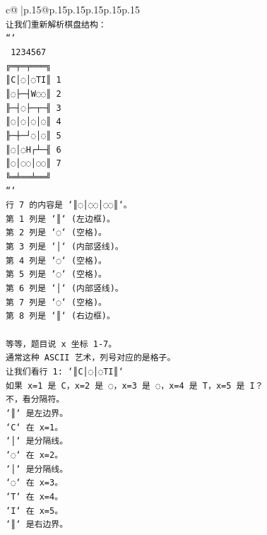 \documentclass{article}
\begin{document}
{\begin{supertabular}{c@{$\;$}|p{.15\linewidth}@{}p{.15\linewidth}p{.15\linewidth}p{.15\linewidth}p{.15\linewidth}p{.15\linewidth}}
{{{\\ 
\texttt{让我们重新解析棋盘结构：} \\
\texttt{```} \\
\texttt{ 1234567} \\
\texttt{╔═╤═╤═══╗} \\
\texttt{║C│◌│◌TI║ 1} \\
\texttt{║◌├─┤W◌◌║ 2} \\
\texttt{╟─┤◌├─┬─╢ 3} \\
\texttt{║◌│◌│◌│◌║ 4} \\
\texttt{╟─┼─┘◌│◌║ 5} \\
\texttt{║◌│◌H┌┴─╢ 6} \\
\texttt{║◌│◌◌│◌◌║ 7} \\
\texttt{╚═╧══╧══╝} \\
\texttt{```} \\
\texttt{行 7 的内容是 `║◌│◌◌│◌◌║`。} \\
\texttt{第 1 列是 `║` (左边框)。} \\
\texttt{第 2 列是 `◌` (空格)。} \\
\texttt{第 3 列是 `│` (内部竖线)。} \\
\texttt{第 4 列是 `◌` (空格)。} \\
\texttt{第 5 列是 `◌` (空格)。} \\
\texttt{第 6 列是 `│` (内部竖线)。} \\
\texttt{第 7 列是 `◌` (空格)。} \\
\texttt{第 8 列是 `║` (右边框)。} \\
\\ 
\texttt{等等，题目说 x 坐标 1{-}7。} \\
\texttt{通常这种 ASCII 艺术，列号对应的是格子。} \\
\texttt{让我们看行 1: `║C│◌│◌TI║`} \\
\texttt{如果 x=1 是 C，x=2 是 ◌，x=3 是 ◌，x=4 是 T，x=5 是 I？} \\
\texttt{不，看分隔符。} \\
\texttt{`║` 是左边界。} \\
\texttt{`C` 在 x=1。} \\
\texttt{`│` 是分隔线。} \\
\texttt{`◌` 在 x=2。} \\
\texttt{`│` 是分隔线。} \\
\texttt{`◌` 在 x=3。} \\
\texttt{`T` 在 x=4。} \\
\texttt{`I` 在 x=5。} \\
\texttt{`║` 是右边界。} \\
}}}
\end{supertabular}}
\end{document}
